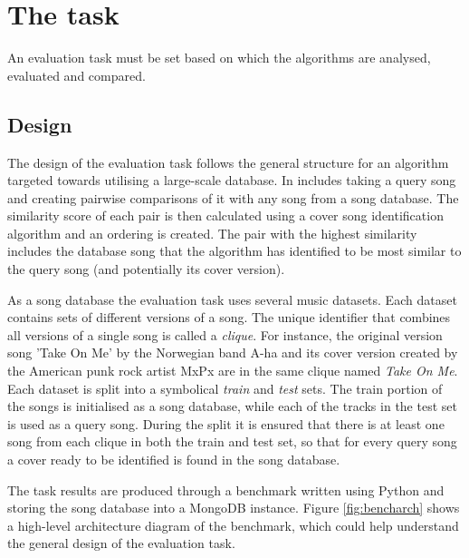 
\chapter{The task}
\label{chap:task}
\ifpdf
    \graphicspath{{EvaluationTask/Figures/PNG/}{EvaluationTask/Figures/PDF/}{EvaluationTask/Figures/}}
\else
    \graphicspath{{EvaluationTask/Figures/EPS/}{EvaluationTask/Figures/}}
\fi


An evaluation task must be set based on which the algorithms are analysed,
evaluated and compared.

\section{Design} 
\label{sec:design}
The design of the evaluation task follows the general structure for an algorithm
targeted towards utilising a large-scale database. In includes taking a query
song and creating pairwise comparisons of it with any song from a song database.
The similarity score of each pair is then calculated using a cover song
identification algorithm and an ordering is created. The pair with the highest
similarity includes the database song that the algorithm has identified to be
most similar to the query song (and potentially its cover version). 

As a song database the evaluation task uses several music datasets. Each dataset
contains sets of different versions of a song. The unique identifier that
combines all versions of a single song is called a \textit{clique}. For
instance, the original version song 'Take On Me' by the Norwegian band A-ha and
its cover version created by the American punk rock artist MxPx are in the same
clique named \textit{Take On Me}. Each dataset is split into a symbolical
\textit{train} and \textit{test} sets. The train portion of the songs is
initialised as a song database, while each of the tracks in the test set is used
as a query song. During the split it is ensured that there is at least one song
from each clique in both the train and test set, so that for every query song a
cover ready to be identified is found in the song database.

The task results are produced through a benchmark written using Python
\cite{python} and storing the song database into a MongoDB \cite{mongodb}
instance. Figure \ref{fig:bencharch} shows a high-level architecture diagram of
the benchmark, which could help understand the general design of the evaluation task.

